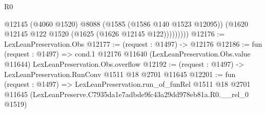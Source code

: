 \begin{lexlean}{R0}
\begin{coremodule}
                @12145
                (@4060 @1520)
                @8088
                (@1585 (@1586 @140 @1523 @12095))
                (@1620 @12145 @122 @1520 (@1625 (@1626 @12145 @122)))))))))
@12176 := LexLeanPreservation.Obs
@12177 := (request : @1497) -> @12176
@12186 := fun (request : @1497) =>
  cond.{1} @12176 @11640 (LexLeanPreservation.Obs.value @11644) LexLeanPreservation.Obs.overflow
@12192 := (request : @1497) -> LexLeanPreservation.RunConv @1511 @18 @2701 @11645
@12201 := fun (request : @1497) =>
  LexLeanPreservation.run_of_funRel
    @1511
    @18
    @2701
    @11645
    (LexLeanPreserve.C7935da1e7adbde9fc43a29dd978eb81a.R0.__rel_0 @1519)
\end{coremodule}
\end{lexlean}
